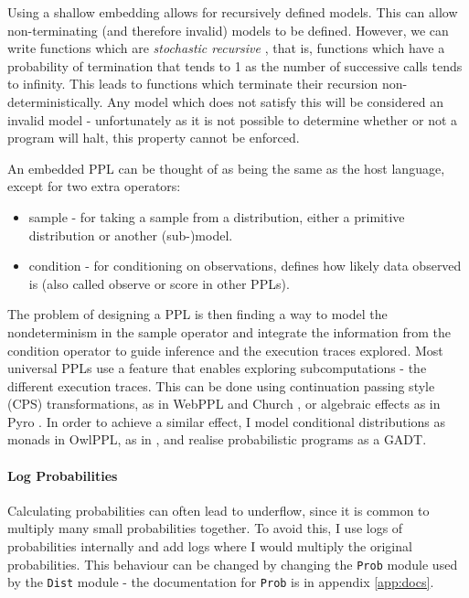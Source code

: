 \documentclass[sigconf]{acmart}
\begin{document}
Using a shallow embedding allows for recursively defined models. This can allow non-terminating (and therefore invalid) models to be defined. However, we can write functions which are \textit{stochastic recursive} \cite{siegmund}, that is, functions which have a probability of termination that tends to 1 as the number of successive calls tends to infinity. This leads to functions which terminate their recursion non-deterministically. Any model which does not satisfy this will be considered an invalid model - unfortunately as it is not possible to determine whether or not a program will halt, this property cannot be enforced.

An embedded PPL can be thought of as being the same as the host language, except for two extra operators:
\begin{itemize}
\item sample - for taking a sample from a distribution, either a primitive distribution or another (sub-)model.
\item condition - for conditioning on observations, defines how likely data observed is (also called observe or score in other PPLs).
\end{itemize}
The problem of designing a PPL is then finding a way to model the nondeterminism in the sample operator and integrate the information from the condition operator to guide inference and the execution traces explored. Most universal PPLs use a feature that enables exploring subcomputations - the different execution traces. This can be done using continuation passing style (CPS) transformations, as in WebPPL and Church \cite{mobus2018structure,goodman2012church}, or algebraic effects as in Pyro \cite{bingham2019pyro}. In order to achieve a similar effect, I model conditional distributions as monads in OwlPPL, as in \cite{scibior2015practical}, and realise probabilistic programs as a GADT.

\paragraph{Log Probabilities}
Calculating probabilities can often lead to underflow, since it is common to multiply many small probabilities together. To avoid this, I use logs of probabilities internally and add logs where I would multiply the original probabilities. This behaviour can be changed by changing the \texttt{Prob} module used by the \texttt{Dist} module - the documentation for \texttt{Prob} is in appendix \ref{app:docs}.
\end{document}
